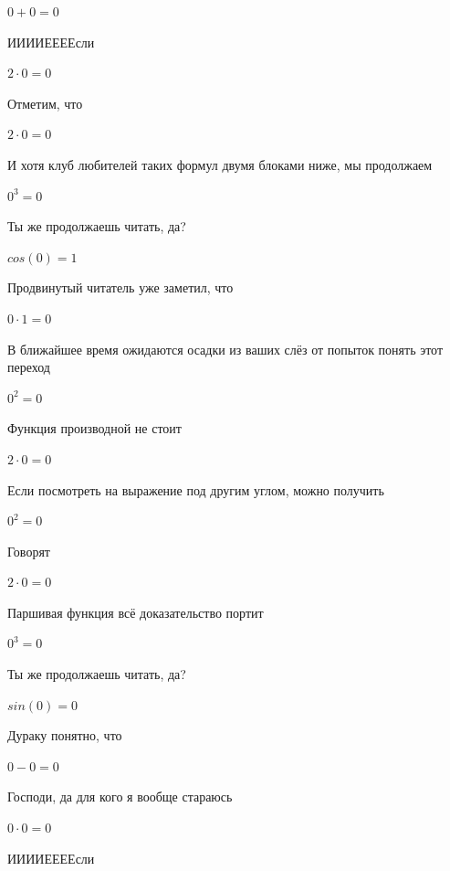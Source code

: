 \documentclass[12pt,a4paper,fleqn]{article}
\begin{document}
\begin{center}$0+0 = 0$\end{center}
ИИИИЕЕЕЕсли\cite{link3}

\begin{center}$2 \cdot 0 = 0$\end{center}
Отметим, что

\begin{center}$2 \cdot 0 = 0$\end{center}
И хотя клуб любителей таких формул двумя блоками ниже, мы продолжаем

\begin{center}$0^{3} = 0$\end{center}
Ты же продолжаешь читать, да?

\begin{center}$cos(0) = 1$\end{center}
Продвинутый читатель уже заметил, что

\begin{center}$0 \cdot 1 = 0$\end{center}
В ближайшее время ожидаются осадки из ваших слёз от попыток понять этот переход

\begin{center}$0^{2} = 0$\end{center}
Функция производной не стоит\cite{link2}

\begin{center}$2 \cdot 0 = 0$\end{center}
Если посмотреть на выражение под другим углом, можно получить

\begin{center}$0^{2} = 0$\end{center}
Говорят

\begin{center}$2 \cdot 0 = 0$\end{center}
Паршивая функция всё доказательство портит\cite{link2}

\begin{center}$0^{3} = 0$\end{center}
Ты же продолжаешь читать, да?

\begin{center}$sin(0) = 0$\end{center}
Дураку понятно, что

\begin{center}$0-0 = 0$\end{center}
Господи, да для кого я вообще стараюсь

\begin{center}$0 \cdot 0 = 0$\end{center}
ИИИИЕЕЕЕсли\cite{link3}
\end{document}
